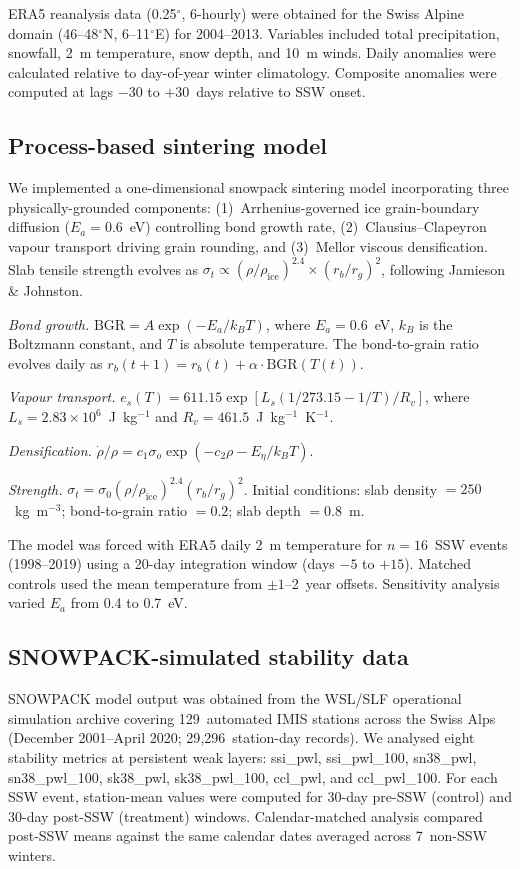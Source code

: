 \documentclass[11pt,a4paper]{article}
\begin{document}
ERA5 reanalysis data (0.25$^\circ$, 6-hourly) were obtained for the Swiss Alpine domain (46--48$^\circ$N, 6--11$^\circ$E) for 2004--2013. Variables included total precipitation, snowfall, 2~m temperature, snow depth, and 10~m winds. Daily anomalies were calculated relative to day-of-year winter climatology. Composite anomalies were computed at lags $-30$ to $+30$~days relative to SSW onset.

\subsection{Process-based sintering model}

We implemented a one-dimensional snowpack sintering model incorporating three physically-grounded components: (1)~Arrhenius-governed ice grain-boundary diffusion ($E_a = 0.6$~eV) controlling bond growth rate, (2)~Clausius--Clapeyron vapour transport driving grain rounding, and (3)~Mellor viscous densification. Slab tensile strength evolves as $\sigma_t \propto (\rho/\rho_{\text{ice}})^{2.4} \times (r_b/r_g)^2$, following Jamieson \& Johnston.

\textit{Bond growth.} $\mathrm{BGR} = A \exp(-E_a / k_B T)$, where $E_a = 0.6$~eV, $k_B$ is the Boltzmann constant, and $T$ is absolute temperature. The bond-to-grain ratio evolves daily as $r_b(t+1) = r_b(t) + \alpha \cdot \mathrm{BGR}(T(t))$.

\textit{Vapour transport.} $e_s(T) = 611.15 \exp[L_s (1/273.15 - 1/T) / R_v]$, where $L_s = 2.83 \times 10^6$~J~kg$^{-1}$ and $R_v = 461.5$~J~kg$^{-1}$~K$^{-1}$.

\textit{Densification.} $\dot{\rho}/\rho = c_1 \sigma_o \exp(-c_2 \rho - E_\eta / k_B T)$.

\textit{Strength.} $\sigma_t = \sigma_0 (\rho / \rho_{\text{ice}})^{2.4} (r_b / r_g)^2$. Initial conditions: slab density $= 250$~kg~m$^{-3}$; bond-to-grain ratio $= 0.2$; slab depth $= 0.8$~m.

The model was forced with ERA5 daily 2~m temperature for $n = 16$~SSW events (1998--2019) using a 20-day integration window (days $-5$ to $+15$). Matched controls used the mean temperature from $\pm 1$--2~year offsets. Sensitivity analysis varied $E_a$ from 0.4 to 0.7~eV.

\subsection{SNOWPACK-simulated stability data}

SNOWPACK model output was obtained from the WSL/SLF operational simulation archive covering 129~automated IMIS stations across the Swiss Alps (December 2001--April 2020; 29{,}296~station-day records). We analysed eight stability metrics at persistent weak layers: ssi\_pwl, ssi\_pwl\_100, sn38\_pwl, sn38\_pwl\_100, sk38\_pwl, sk38\_pwl\_100, ccl\_pwl, and ccl\_pwl\_100. For each SSW event, station-mean values were computed for 30-day pre-SSW (control) and 30-day post-SSW (treatment) windows. Calendar-matched analysis compared post-SSW means against the same calendar dates averaged across 7~non-SSW winters.
\end{document}

